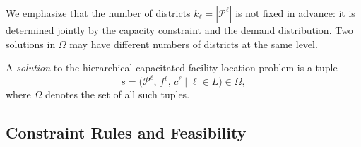\documentclass[preprint,12pt,authoryear]{elsarticle}
\theoremstyle{definition}
\begin{document}
We emphasize that the number of districts $k_\ell = |\mathcal{P}^\ell|$ is not fixed in advance:
it is determined jointly by the capacity constraint and the demand distribution.
Two solutions in $\Omega$ may have different numbers of districts at the same
level.

A \emph{solution} to the hierarchical capacitated facility location problem is a tuple
%
\begin{equation}\label{eq:solution}
    s = \bigl(\mathcal{P}^\ell,\, f^\ell,\, c^\ell
    \;\big|\; \ell \in L\bigr) \in \Omega,
\end{equation}
%
where $\Omega$ denotes the set of all such tuples.




\subsection{Constraint Rules and Feasibility}
\label{sec:rules}
\end{document}
